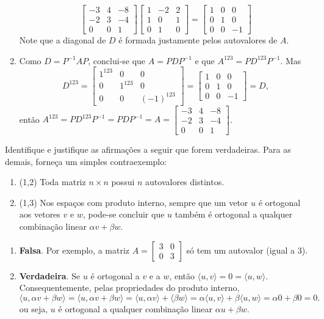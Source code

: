 \documentclass[12pt,a4paper]{article}
\begin{document}
\begin{ExerciseList}
\begin{enumerate}
\[\begin{bmatrix}
-3 & 4 & -8\\
-2 & 3 & -4\\
 0 & 0 &  1
\end{bmatrix}
\begin{bmatrix}
1 & -2 & 2\\
1 &  0 & 1\\
0 &  1 & 0
\end{bmatrix}
=
\begin{bmatrix}
1 & 0 & 0\\
0 & 1 & 0\\
0 & 0 & -1
\end{bmatrix}
\]
Note que a diagonal de $D$ é formada justamente pelos autovalores de $A$.
\item Como $D = P^{-1} A P$, conclui-se que $A = P D P^{-1}$ e que $A^{123}= P D^{123} P^{-1}$. Mas
\[
D^{123}
=
\begin{bmatrix}
1^{123} & 0 & 0\\
0 & 1^{123} & 0\\
0 & 0 & (-1)^{123}
\end{bmatrix}
=
\begin{bmatrix}
1 & 0 & 0\\
0 & 1 & 0\\
0 & 0 & -1
\end{bmatrix}
= D,
\]
então $A^{123} = P D^{123} P^{-1} = P D P^{-1} = A =
\begin{bmatrix}
-3 & 4 & -8\\
-2 & 3 & -4\\
 0 & 0 &  1
\end{bmatrix}$.
\end{enumerate}


\Exercise[title={2,5}] Identifique e justifique as afirmações a seguir que forem verdadeiras. Para as demais, forneça um simples contraexemplo:
\begin{enumerate}
\item (1,2) Toda matriz $n \times n$ possui $n$ autovalores distintos.
\item (1,3) Nos espaços com produto interno, sempre que um vetor $u$ é ortogonal aos vetores $v$ e $w$, pode-se concluir que $u$ também é ortogonal a qualquer combinação linear $\alpha v + \beta w$.
\end{enumerate}
\Answer
\begin{enumerate}
\item \textbf{Falsa}. Por exemplo, a matriz $A = \begin{bmatrix}
3 & 0 \\ 0 & 3
\end{bmatrix}$ só tem um autovalor (igual a $3$).
\item \textbf{Verdadeira}. Se $u$ é ortogonal a $v$ e a $w$, então $\langle u, v \rangle = 0 = \langle u, w \rangle$. Consequentemente, pelas propriedades do produto interno,
\[
  \langle u, \alpha v + \beta w \rangle
= \langle u, \alpha v + \beta w \rangle
= \langle u, \alpha v \rangle + \langle \beta w \rangle
= \alpha \langle u, v \rangle + \beta \langle u,w \rangle
= \alpha 0 + \beta 0
= 0.
\]
ou seja, $u$ é ortogonal a qualquer combinação linear $\alpha u + \beta w$.
\end{enumerate}



\end{ExerciseList}
\end{document}
